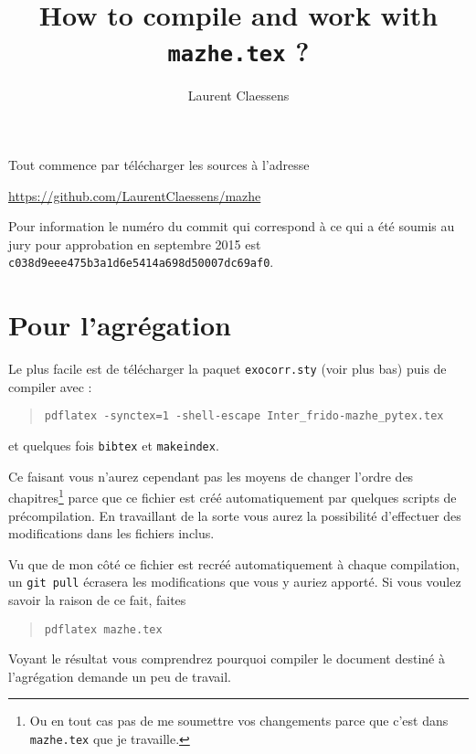 \documentclass[a4paper,12pt]{article}
\newcommand{\info}[1]{\texttt{#1}}
\begin{document}
\title{How to compile and work with \info{mazhe.tex} ?}
\author{Laurent Claessens}
\maketitle

\tableofcontents


Tout commence par télécharger les sources à l'adresse
\begin{center}
    \url{https://github.com/LaurentClaessens/mazhe}
\end{center}

Pour information le numéro du commit qui correspond à ce qui a été soumis au jury pour approbation en septembre 2015 est \info{c038d9eee475b3a1d6e5414a698d50007dc69af0}.

\section{Pour l'agrégation}

Le plus facile est de télécharger la paquet \info{exocorr.sty} (voir plus bas) puis de compiler avec :
\begin{quote}
    \info{pdflatex -synctex=1 -shell-escape Inter\_frido-mazhe\_pytex.tex  }
\end{quote}
et quelques fois \info{bibtex} et \info{makeindex}.

Ce faisant vous n'aurez cependant pas les moyens de changer l'ordre des chapitres\footnote{Ou en tout cas pas de me soumettre vos changements parce que c'est dans \info{mazhe.tex} que je travaille.} parce que ce fichier est créé automatiquement par quelques scripts de précompilation. En travaillant de la sorte vous aurez la possibilité d'effectuer des modifications dans les fichiers inclus.

Vu que de mon côté ce fichier est recréé automatiquement à chaque compilation, un \info{git pull} écrasera les modifications que vous y auriez apporté. Si vous voulez savoir la raison de ce fait, faites
\begin{quote}
    \info{pdflatex mazhe.tex}
\end{quote}
Voyant le résultat vous comprendrez pourquoi compiler le document destiné à l'agrégation demande un peu de travail.
\end{document}
